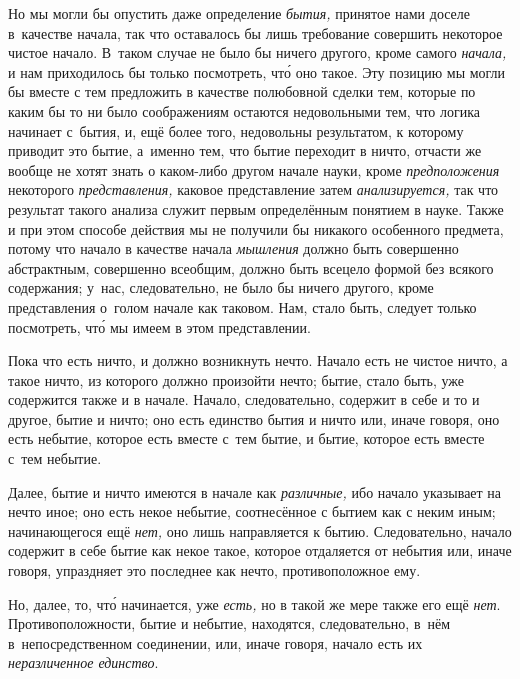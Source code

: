 Но мы могли бы опустить даже определение {\em бытия,} принятое нами доселе
в~качестве начала, так что оставалось бы лишь требование совершить некоторое
чистое начало. В~таком случае не было бы ничего другого, кроме самого
{\em начала,} и нам приходилось бы только посмотреть, чт\'{о} оно такое. Эту
позицию мы могли бы вместе с тем предложить в качестве полюбовной сделки тем,
которые по каким бы то ни было соображениям остаются недовольными тем, что
логика начинает с~бытия, и, ещё более того, недовольны результатом, к которому
приводит это бытие, а~именно тем, что бытие переходит в ничто, отчасти же
вообще не хотят знать о каком-либо другом начале науки, кроме
{\em предположения} некоторого {\em представления,} каковое представление затем
{\em анализируется,} так что результат такого анализа служит первым
определённым понятием в науке. Также и при этом способе действия мы не получили
бы никакого особенного предмета, потому что начало в качестве начала
{\em мышления} должно быть совершенно абстрактным, совершенно всеобщим, должно
быть всецело формой без всякого содержания; у~нас, следовательно, не было бы
ничего другого, кроме представления о~голом начале как таковом. Нам, стало
быть, следует только посмотреть, чт\'{о} мы имеем в этом представлении.

Пока что есть ничто, и должно возникнуть нечто. Начало есть не чистое ничто,
а такое ничто, из которого должно произойти нечто; бытие, стало быть, уже
содержится также и в начале. Начало, следовательно, содержит в себе и то и
другое, бытие и ничто; оно есть единство бытия и ничто или, иначе говоря,
оно есть небытие, которое есть вместе с~тем бытие, и бытие, которое есть
вместе с~тем небытие.

Далее, бытие и ничто имеются в начале как {\em различные,} ибо начало указывает
на нечто иное; оно есть некое небытие, соотнесённое с бытием как с неким иным;
начинающегося ещё {\em нет,} оно лишь направляется к бытию. Следовательно,
начало содержит в себе бытие как некое такое, которое отдаляется от небытия
или, иначе говоря, упраздняет это последнее как нечто, противоположное ему.

Но, далее, то, чт\'{о} начинается, уже {\em есть,} но в такой же мере также его
ещё {\em нет}. Противоположности, бытие и небытие, находятся, следовательно,
в~нём в~непосредственном соединении, или, иначе говоря, начало есть их
{\em неразличенное единство}.

